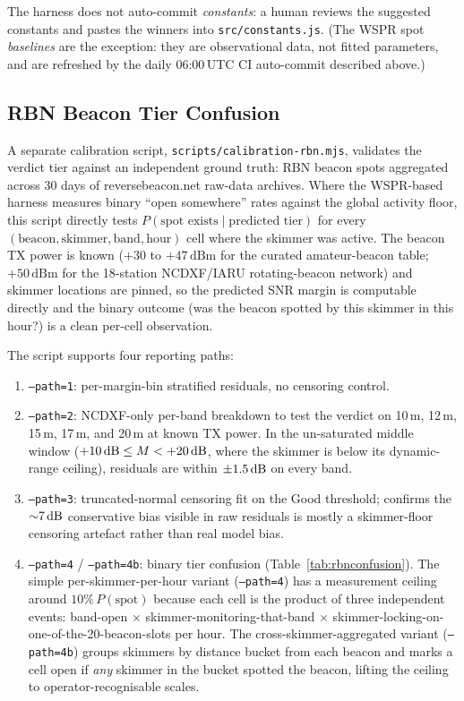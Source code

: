 \documentclass[11pt,a4paper]{article}
\newcommand{\si}[1]{\text{#1}}
\newcommand{\dB}{\text{dB}}
\begin{document}
The harness does not auto-commit \emph{constants}: a human
reviews the suggested
constants and pastes the winners into \texttt{src/constants.js}.
(The WSPR spot \emph{baselines} are the exception: they are
observational data, not fitted parameters, and are refreshed by
the daily 06:00\,UTC CI auto-commit described above.)

\subsection{RBN Beacon Tier Confusion}\label{sec:rbn-tier-confusion}

A separate calibration script,
\texttt{scripts/calibration-rbn.mjs}, validates the verdict tier
against an independent ground truth: RBN beacon spots aggregated
across 30 days of reversebeacon.net raw-data archives.  Where the
WSPR-based harness measures binary ``open somewhere'' rates against
the global activity floor, this script directly tests
$P(\text{spot exists} \mid \text{predicted tier})$ for every
$(\text{beacon},\text{skimmer},\text{band},\text{hour})$ cell where
the skimmer was active.  The beacon TX power is known
($+30$ to $+47\,\si{dBm}$ for the curated amateur-beacon table;
$+50\,\si{dBm}$ for the 18-station NCDXF/IARU rotating-beacon
network) and skimmer locations are pinned, so the predicted SNR
margin is computable directly and the binary outcome (was the
beacon spotted by this skimmer in this hour?) is a clean
per-cell observation.

The script supports four reporting paths:

\begin{enumerate}[nosep]
  \item \texttt{--path=1}: per-margin-bin stratified residuals,
        no censoring control.
  \item \texttt{--path=2}: NCDXF-only per-band breakdown to test
        the verdict on 10\,m, 12\,m, 15\,m, 17\,m, and 20\,m at
        known TX power.  In the un-saturated middle window
        ($+10\,\si{\dB} \leq M < +20\,\si{\dB}$, where the
        skimmer is below its dynamic-range ceiling), residuals
        are within $\pm 1.5\,\si{\dB}$ on every band.
  \item \texttt{--path=3}: truncated-normal censoring fit on the
        Good threshold; confirms the ${\sim}7\,\si{\dB}$
        conservative bias visible in raw residuals is mostly a
        skimmer-floor censoring artefact rather than real model
        bias.
  \item \texttt{--path=4} / \texttt{--path=4b}: binary tier
        confusion (Table~\ref{tab:rbnconfusion}).  The simple
        per-skimmer-per-hour variant
        (\texttt{--path=4}) has a measurement ceiling around
        $10\%\,P(\text{spot})$ because each cell is the product
        of three independent events: band-open
        $\times$ skimmer-monitoring-that-band
        $\times$ skimmer-locking-on-one-of-the-20-beacon-slots
        per hour.  The cross-skimmer-aggregated variant
        (\texttt{--path=4b}) groups skimmers by distance bucket
        from each beacon and marks a cell open if \emph{any}
        skimmer in the bucket spotted the beacon, lifting the
        ceiling to operator-recognisable scales.
\end{enumerate}
\end{document}
